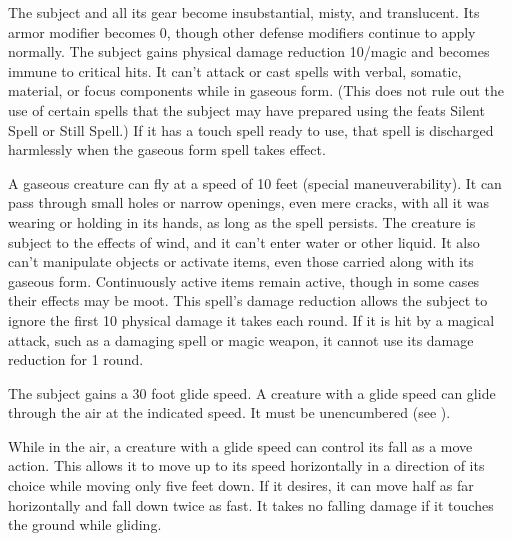 \begin{comment}
\subsubsection{G}
\end{comment}

\spelldur{\durshort \dismissable}
\spelleffect The subject and all its gear become insubstantial, misty, and translucent. Its armor modifier becomes 0, though other defense modifiers continue to apply normally. The subject gains physical damage reduction 10/magic and becomes immune to critical hits. It can't attack or cast spells with verbal, somatic, material, or focus components while in gaseous form. (This does not rule out the use of certain spells that the subject may have prepared using the feats Silent Spell or Still Spell.) If it has a touch spell ready to use, that spell is discharged harmlessly when the gaseous form spell takes effect.
\par A gaseous creature can fly at a speed of 10 feet (special maneuverability). It can pass through small holes or narrow openings, even mere cracks, with all it was wearing or holding in its hands, as long as the spell persists. The creature is subject to the effects of wind, and it can't enter water or other liquid. It also can't manipulate objects or activate items, even those carried along with its gaseous form. Continuously active items remain active, though in some cases their effects may be moot.
\spellnotes This spell's damage reduction allows the subject to ignore the first 10 physical damage it takes each round. If it is hit by a magical attack, such as a damaging spell or magic weapon, it cannot use its damage reduction for 1 round.

\spelldur{\durlong}
\spelleffect The subject gains a 30 foot glide speed.
\spellnotes A creature with a glide speed can glide through the air at the indicated speed. It must be unencumbered (see ).

While in the air, a creature with a glide speed can control its fall as a move action. This allows it to move up to its speed horizontally in a direction of its choice while moving only five feet down. If it desires, it can move half as far horizontally and fall down twice as fast. It takes no falling damage if it touches the ground while gliding.

